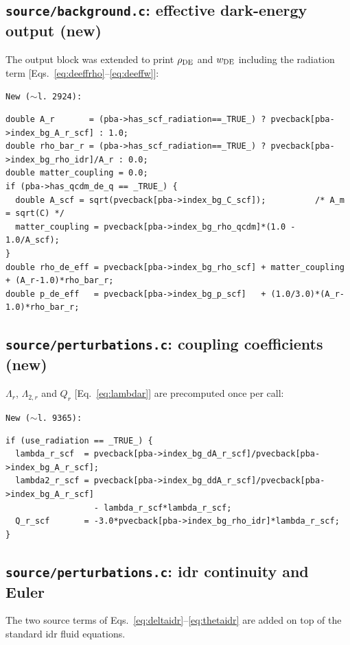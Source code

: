 \documentclass[11pt,a4paper,english,twoside]{article}
\newcommand{\codefile}[1]{\smallskip\noindent\texttt{\small #1}\par\nopagebreak}
\begin{document}
\subsection{\texttt{source/background.c}: effective dark-energy output (new)}

The output block was extended to print $\rho_{\rm DE}$ and $w_{\rm DE}$ including
the radiation term [Eqs.~\eqref{eq:deeffrho}--\eqref{eq:deeffw}]:

\codefile{New ($\sim$l.\,2924):}
\begin{lstlisting}[style=cstyle]
double A_r       = (pba->has_scf_radiation==_TRUE_) ? pvecback[pba->index_bg_A_r_scf] : 1.0;
double rho_bar_r = (pba->has_scf_radiation==_TRUE_) ? pvecback[pba->index_bg_rho_idr]/A_r : 0.0;
double matter_coupling = 0.0;
if (pba->has_qcdm_de_q == _TRUE_) {
  double A_scf = sqrt(pvecback[pba->index_bg_C_scf]);          /* A_m = sqrt(C) */
  matter_coupling = pvecback[pba->index_bg_rho_qcdm]*(1.0 - 1.0/A_scf);
}
double rho_de_eff = pvecback[pba->index_bg_rho_scf] + matter_coupling + (A_r-1.0)*rho_bar_r;
double p_de_eff   = pvecback[pba->index_bg_p_scf]   + (1.0/3.0)*(A_r-1.0)*rho_bar_r;
\end{lstlisting}

\subsection{\texttt{source/perturbations.c}: coupling coefficients (new)}

$\Lambda_r$, $\Lambda_{2,r}$ and $Q_r$ [Eq.~\eqref{eq:lambdar}] are precomputed
once per call:

\codefile{New ($\sim$l.\,9365):}
\begin{lstlisting}[style=cstyle]
if (use_radiation == _TRUE_) {
  lambda_r_scf  = pvecback[pba->index_bg_dA_r_scf]/pvecback[pba->index_bg_A_r_scf];
  lambda2_r_scf = pvecback[pba->index_bg_ddA_r_scf]/pvecback[pba->index_bg_A_r_scf]
                  - lambda_r_scf*lambda_r_scf;
  Q_r_scf       = -3.0*pvecback[pba->index_bg_rho_idr]*lambda_r_scf;
}
\end{lstlisting}

\subsection{\texttt{source/perturbations.c}: idr continuity and Euler}

The two source terms of Eqs.~\eqref{eq:deltaidr}--\eqref{eq:thetaidr} are added on
top of the standard idr fluid equations.
\end{document}
